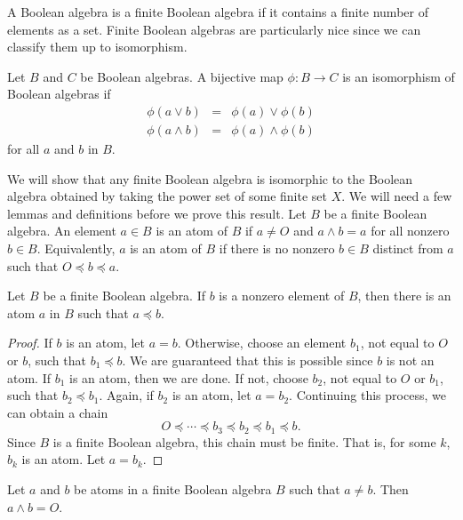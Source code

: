  
A Boolean algebra is a {\bfi finite Boolean algebra\/} if it contains a finite number of elements as a set.
Finite Boolean algebras are particularly nice since we can classify
them  up to isomorphism.   
 
 
Let $B$ and $C$ be Boolean algebras.  A bijective map $\phi : B
\rightarrow C$ is an {\bfi isomorphism\/} of Boolean
algebras  if 
\begin{eqnarray*}
\phi( a \vee b )  & = & \phi(a) \vee \phi(b) \\
\phi( a \wedge b )  & = & \phi(a) \wedge \phi(b)
\end{eqnarray*}
for all $a$ and $b$ in $B$. 
 
 
We will show that any finite Boolean algebra is isomorphic to the 
Boolean algebra obtained by taking the power set of some finite set 
$X$. We will need a few lemmas and definitions before we prove this result.
Let $B$ be a finite Boolean algebra. An element $a \in B$ is  an {\bfi
atom\/} of $B$ if $a \neq
O$ and $a \wedge b = a$ for all nonzero $b \in B$. Equivalently, $a$ is an
atom of $B$ if there is no nonzero $b \in B$ distinct from $a$ such
that $O \preceq b \preceq a$. 
 
 
\begin{lemma}
Let $B$ be a finite Boolean algebra. If $b$ is a nonzero element of
$B$, then there is an atom $a$ in $B$ such that $a \preceq b$.
\end{lemma}
 
 
\begin{proof}
If $b$ is an atom, let $a =b$. Otherwise, choose an element $b_1$, not
equal to $O$ or $b$, such that $b_1 \preceq b$. We are guaranteed that
this is possible since $b$ is not an atom. If $b_1$ is an atom, then
we are done.  If not, choose $b_2$, not equal to $O$ or $b_1$, such that 
$b_2 \preceq b_1$. Again, if $b_2$ is an atom, let $a = b_2$.
Continuing this process, we can obtain a chain
$$
O \preceq \cdots \preceq b_3 \preceq b_2 \preceq b_1 \preceq b.
$$
Since $B$ is a finite Boolean algebra, this chain must be finite.  That
is, for some $k$, $b_k$ is an atom. Let $a = b_k$.
\end{proof}
 
 
\begin{lemma}
Let $a$ and $b$ be atoms in a finite Boolean algebra $B$ such that $a
\neq b$. Then $a \wedge b = O$.
\end{lemma}
 
